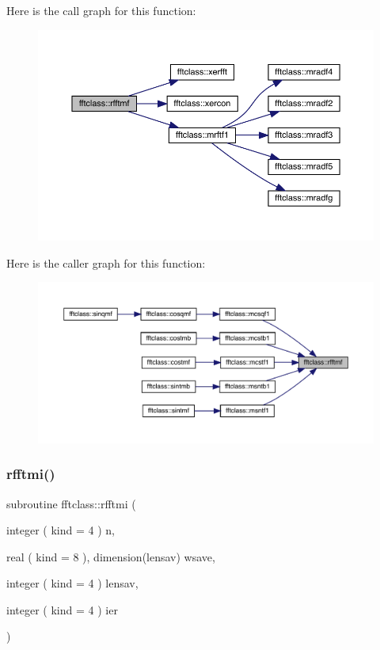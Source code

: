 Here is the call graph for this function\+:\nopagebreak
\begin{figure}[H]
\begin{center}
\leavevmode
\includegraphics[width=350pt]{namespacefftclass_a4662111bc784aa321b0567a1a0578963_cgraph}
\end{center}
\end{figure}
Here is the caller graph for this function\+:\nopagebreak
\begin{figure}[H]
\begin{center}
\leavevmode
\includegraphics[width=350pt]{namespacefftclass_a4662111bc784aa321b0567a1a0578963_icgraph}
\end{center}
\end{figure}
\mbox{\label{namespacefftclass_a6a543283f910322f94293d719f923881}} 
\subsubsection{\texorpdfstring{rfftmi()}{rfftmi()}}
{\footnotesize\ttfamily subroutine fftclass\+::rfftmi (\begin{DoxyParamCaption}\item[{integer ( kind = 4 )}]{n,  }\item[{real ( kind = 8 ), dimension(lensav)}]{wsave,  }\item[{integer ( kind = 4 )}]{lensav,  }\item[{integer ( kind = 4 )}]{ier }\end{DoxyParamCaption})}

